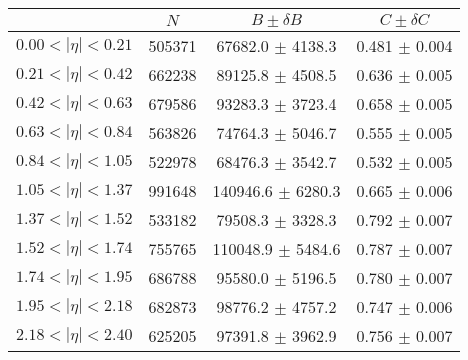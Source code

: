 \begin{tabular}{lccc}
\hline
    &   $N$   & $B \pm \delta B$  &  $C \pm \delta C$ \\
\hline
$0.00 < |\eta| <0.21$          & 505371     & 67682.0    $\pm$ 4138.3 & 0.481      $\pm$ 0.004 \\
$0.21 < |\eta| <0.42$          & 662238     & 89125.8    $\pm$ 4508.5 & 0.636      $\pm$ 0.005 \\
$0.42 < |\eta| <0.63$          & 679586     & 93283.3    $\pm$ 3723.4 & 0.658      $\pm$ 0.005 \\
$0.63 < |\eta| <0.84$          & 563826     & 74764.3    $\pm$ 5046.7 & 0.555      $\pm$ 0.005 \\
$0.84 < |\eta| <1.05$          & 522978     & 68476.3    $\pm$ 3542.7 & 0.532      $\pm$ 0.005 \\
$1.05 < |\eta| <1.37$          & 991648     & 140946.6   $\pm$ 6280.3 & 0.665      $\pm$ 0.006 \\
$1.37 < |\eta| <1.52$          & 533182     & 79508.3    $\pm$ 3328.3 & 0.792      $\pm$ 0.007 \\
$1.52 < |\eta| <1.74$          & 755765     & 110048.9   $\pm$ 5484.6 & 0.787      $\pm$ 0.007 \\
$1.74 < |\eta| <1.95$          & 686788     & 95580.0    $\pm$ 5196.5 & 0.780      $\pm$ 0.007 \\
$1.95 < |\eta| <2.18$          & 682873     & 98776.2    $\pm$ 4757.2 & 0.747      $\pm$ 0.006 \\
$2.18 < |\eta| <2.40$          & 625205     & 97391.8    $\pm$ 3962.9 & 0.756      $\pm$ 0.007 \\
\hline
\end{tabular}
